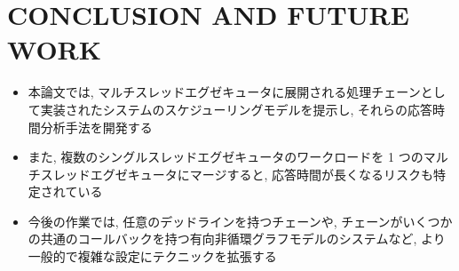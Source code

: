 
\section{CONCLUSION AND FUTURE WORK}
\label{sec: conclusion and future work}

\begin{frame}{}
    \begin{itemize}
        \item 本論文では, マルチスレッドエグゼキュータに展開される処理チェーンとして実装されたシステムのスケジューリングモデルを提示し, それらの応答時間分析手法を開発する
\item また, 複数のシングルスレッドエグゼキュータのワークロードを 1 つのマルチスレッドエグゼキュータにマージすると, 応答時間が長くなるリスクも特定されている
\item 今後の作業では, 任意のデッドラインを持つチェーンや, チェーンがいくつかの共通のコールバックを持つ有向非循環グラフモデルのシステムなど, より一般的で複雑な設定にテクニックを拡張する
    \end{itemize}
\end{frame}
